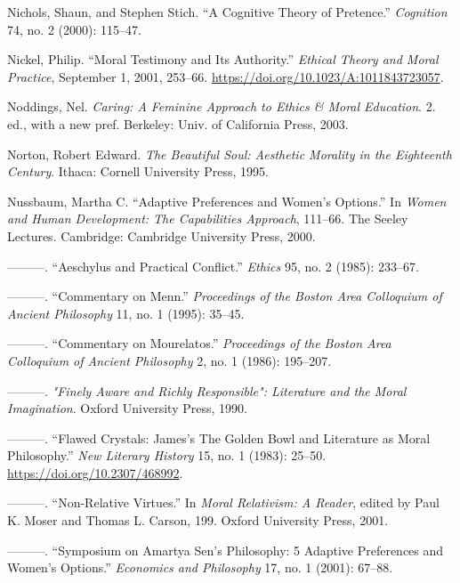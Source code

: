 \documentclass[phdthesis,12pt,final]{wuthesis}
\newlength{\cslhangindent}
\newenvironment{CSLReferences}[2] %
{\begin{list}{}{%
	\setlength{\itemindent}{0pt}
	\setlength{\leftmargin}{0pt}
	\setlength{\parsep}{0pt}
	\ifodd #1
	\setlength{\leftmargin}{\cslhangindent}
	\setlength{\itemindent}{-1\cslhangindent}
	\fi
	\setlength{\itemsep}{#2\baselineskip}}}
{\end{list}}
\theoremstyle{definition}
\theoremstyle{definition}
\theoremstyle{definition}
\theoremstyle{definition}
\theoremstyle{remark}
\begin{document}
\begin{CSLReferences}{1}{0}
Nichols, Shaun, and Stephen Stich. {``A {Cognitive Theory} of {Pretence}.''} \emph{Cognition} 74, no. 2 (2000): 115--47.

Nickel, Philip. {``Moral {Testimony} and Its {Authority}.''} \emph{Ethical Theory and Moral Practice}, September 1, 2001, 253--66. \url{https://doi.org/10.1023/A:1011843723057}.

Noddings, Nel. \emph{Caring: A Feminine Approach to Ethics \& Moral Education}. 2. ed., with a new pref. Berkeley: Univ. of California Press, 2003.

Norton, Robert Edward. \emph{The Beautiful Soul: Aesthetic Morality in the Eighteenth Century}. Ithaca: Cornell University Press, 1995.

Nussbaum, Martha C. {``Adaptive {Preferences} and {Women}'s {Options}.''} In \emph{Women and Human Development: {The} Capabilities Approach}, 111--66. The Seeley Lectures. Cambridge: Cambridge University Press, 2000.

---------. {``Aeschylus and Practical Conflict.''} \emph{Ethics} 95, no. 2 (1985): 233--67.

---------. {``Commentary on {Menn}.''} \emph{Proceedings of the Boston Area Colloquium of Ancient Philosophy} 11, no. 1 (1995): 35--45.

---------. {``Commentary on {Mourelatos}.''} \emph{Proceedings of the Boston Area Colloquium of Ancient Philosophy} 2, no. 1 (1986): 195--207.

---------. \emph{"{Finely Aware} and {Richly Responsible}": {Literature} and the {Moral Imagination}}. Oxford University Press, 1990.

---------. {``Flawed {Crystals}: {James}'s {The Golden Bowl} and {Literature} as {Moral Philosophy}.''} \emph{New Literary History} 15, no. 1 (1983): 25--50. \url{https://doi.org/10.2307/468992}.

---------. {``Non-Relative Virtues.''} In \emph{Moral {Relativism}: {A Reader}}, edited by Paul K. Moser and Thomas L. Carson, 199. Oxford University Press, 2001.

---------. {``Symposium on {Amartya Sen}'s Philosophy: 5 Adaptive Preferences and Women's Options.''} \emph{Economics and Philosophy} 17, no. 1 (2001): 67--88.


\end{CSLReferences}
\end{document}
